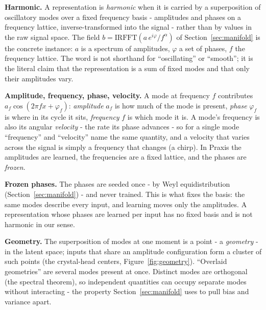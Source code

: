 \textbf{Harmonic.} A representation is \textit{harmonic} when it is carried by a superposition of oscillatory modes over a fixed frequency basis - amplitudes and phases on a frequency lattice, inverse-transformed into the signal - rather than by values in the raw signal space. The field $b = \mathrm{IRFFT}(a\,e^{i\varphi}/f^{\alpha})$ of Section~\ref{sec:manifold} is the concrete instance: $a$ is a spectrum of amplitudes, $\varphi$ a set of phases, $f$ the frequency lattice. The word is not shorthand for ``oscillating'' or ``smooth''; it is the literal claim that the representation is a sum of fixed modes and that only their amplitudes vary.

\textbf{Amplitude, frequency, phase, velocity.} A mode at frequency $f$ contributes $a_f\cos(2\pi f x + \varphi_f)$: \textit{amplitude} $a_f$ is how much of the mode is present, \textit{phase} $\varphi_f$ is where in its cycle it sits, \textit{frequency} $f$ is which mode it is. A mode's frequency is also its angular \textit{velocity} - the rate its phase advances - so for a single mode ``frequency'' and ``velocity'' name the same quantity, and a velocity that varies across the signal is simply a frequency that changes (a chirp). In Praxis the amplitudes are learned, the frequencies are a fixed lattice, and the phases are \textit{frozen}.

\textbf{Frozen phases.} The phases are seeded once - by Weyl equidistribution (Section~\ref{sec:manifold}) - and never trained. This is what fixes the basis: the same modes describe every input, and learning moves only the amplitudes. A representation whose phases are learned per input has no fixed basis and is not harmonic in our sense.

\textbf{Geometry.} The superposition of modes at one moment is a point - a \textit{geometry} - in the latent space; inputs that share an amplitude configuration form a cluster of such points (the crystal-head centers, Figure~\ref{fig:geometry}). ``Overlaid geometries'' are several modes present at once. Distinct modes are orthogonal (the spectral theorem), so independent quantities can occupy separate modes without interacting - the property Section~\ref{sec:manifold} uses to pull bias and variance apart.

